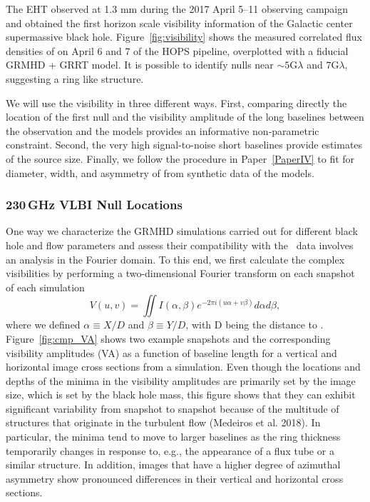 The EHT observed \sgra at 1.3 mm during the 2017 April 5--11 observing
campaign and obtained the first horizon scale visibility information
of the Galactic center supermassive black hole.
Figure~\ref{fig:visibility} shows the measured correlated flux
densities of \sgra on April 6 and 7 of the HOPS pipeline, overplotted
with a fiducial GRMHD + GRRT model.
It is possible to identify nulls near $\sim 5\mathrm{G}\lambda$ and
$7\mathrm{G}\lambda$, suggesting a ring like structure.

We will use the visibility in three different ways.
First, comparing directly the location of the first null and the
visibility amplitude of the long baselines between the observation and
the models provides an informative non-parametric constraint.
Second, the very high signal-to-noise short baselines provide
estimates of the source size.
Finally, we follow the procedure in Paper~\ref{PaperIV} to fit for
diameter, width, and asymmetry of from synthetic data of the models.

\subsubsection{230\,GHz VLBI Null Locations}


One way we characterize the GRMHD simulations carried out for
different black hole and flow parameters and assess their
compatibility with the \sgra\ data involves an analysis in the Fourier
domain.
To this end, we first calculate the complex visibilities by performing
a two-dimensional Fourier transform on each snapshot of each
simulation
\begin{equation}
  V(u,v) = \iint I(\alpha,\beta) e^{-2\pi i(u\alpha+v\beta)}d\alpha d\beta,
\end{equation}
where we defined $\alpha \equiv X/D$ and $\beta \equiv Y/D$, with D
being the distance to \sgra.
Figure~\ref{fig:cmp_VA} shows two example snapshots and the
corresponding visibility amplitudes (VA) as a function of baseline
length for a vertical and horizontal image cross sections from a
simulation.
Even though the locations and depths of the minima in the visibility
amplitudes are primarily set by the image size, which is set by the
black hole mass, this figure shows that they can exhibit significant
variability from snapshot to snapshot because of the multitude of
structures that originate in the turbulent flow (Medeiros et
al. 2018).
In particular, the minima tend to move to larger baselines as the ring
thickness temporarily changes in response to, e.g., the appearance of
a flux tube or a similar structure.
In addition, images that have a higher degree of azimuthal asymmetry
show pronounced differences in their vertical and horizontal cross
sections.

